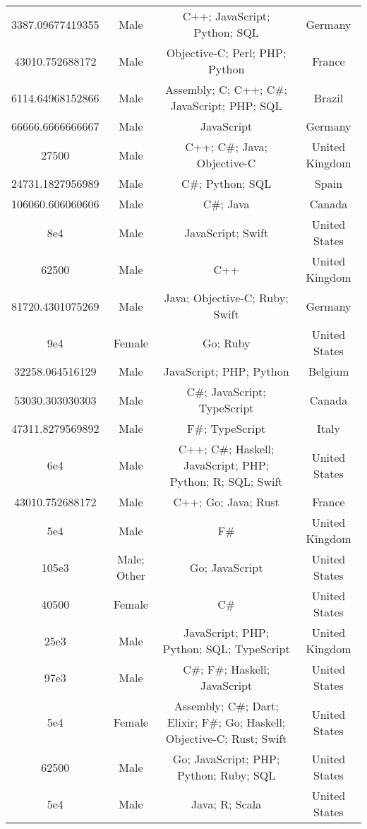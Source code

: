 \begin{center}
\begin{tabular}{ |c|c|c|c| }
3387.09677419355  &  Male  &  C++; JavaScript; Python; SQL  &  Germany  \\ 
43010.752688172  &  Male  &  Objective-C; Perl; PHP; Python  &  France  \\ 
6114.64968152866  &  Male  &  Assembly; C; C++; C\#; JavaScript; PHP; SQL  &  Brazil  \\ 
66666.6666666667  &  Male  &  JavaScript  &  Germany  \\ 
27500  &  Male  &  C++; C\#; Java; Objective-C  &  United Kingdom  \\ 
24731.1827956989  &  Male  &  C\#; Python; SQL  &  Spain  \\ 
106060.606060606  &  Male  &  C\#; Java  &  Canada  \\ 
8e4  &  Male  &  JavaScript; Swift  &  United States  \\ 
62500  &  Male  &  C++  &  United Kingdom  \\ 
81720.4301075269  &  Male  &  Java; Objective-C; Ruby; Swift  &  Germany  \\ 
9e4  &  Female  &  Go; Ruby  &  United States  \\ 
32258.064516129  &  Male  &  JavaScript; PHP; Python  &  Belgium  \\ 
53030.303030303  &  Male  &  C\#; JavaScript; TypeScript  &  Canada  \\ 
47311.8279569892  &  Male  &  F\#; TypeScript  &  Italy  \\ 
6e4  &  Male  &  C++; C\#; Haskell; JavaScript; PHP; Python; R; SQL; Swift  &  United States  \\ 
43010.752688172  &  Male  &  C++; Go; Java; Rust  &  France  \\ 
5e4  &  Male  &  F\#  &  United Kingdom  \\ 
105e3  &  Male; Other  &  Go; JavaScript  &  United States  \\ 
40500  &  Female  &  C\#  &  United States  \\ 
25e3  &  Male  &  JavaScript; PHP; Python; SQL; TypeScript  &  United Kingdom  \\ 
97e3  &  Male  &  C\#; F\#; Haskell; JavaScript  &  United States  \\ 
5e4  &  Female  &  Assembly; C\#; Dart; Elixir; F\#; Go; Haskell; Objective-C; Rust; Swift  &  United States  \\ 
62500  &  Male  &  Go; JavaScript; PHP; Python; Ruby; SQL  &  United States  \\ 
5e4  &  Male  &  Java; R; Scala  &  United States  \\ 

\end{tabular}
\end{center}
